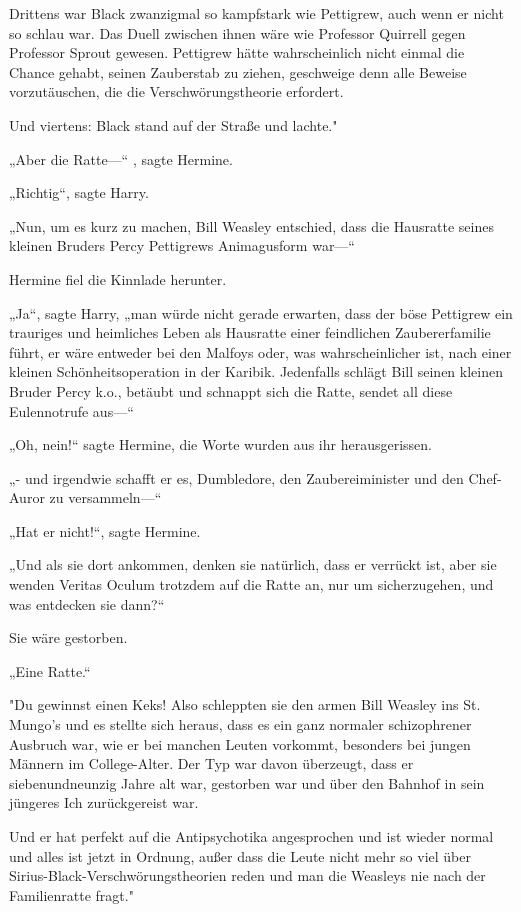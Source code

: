 {Drittens war Black zwanzigmal so kampfstark wie Pettigrew, auch wenn er nicht so schlau war. Das Duell zwischen ihnen wäre wie Professor Quirrell gegen Professor Sprout gewesen. Pettigrew hätte wahrscheinlich nicht einmal die Chance gehabt, seinen Zauberstab zu ziehen, geschweige denn alle Beweise vorzutäuschen, die die Verschwörungstheorie erfordert.

Und viertens: Black stand auf der Straße und lachte."

„Aber die Ratte—“ , sagte Hermine.

„Richtig“, sagte Harry.

„Nun, um es kurz zu machen, Bill Weasley entschied, dass die Hausratte seines kleinen Bruders Percy Pettigrews Animagusform war—“

Hermine fiel die Kinnlade herunter.

„Ja“, sagte Harry, „man würde nicht gerade erwarten, dass der böse Pettigrew ein trauriges und heimliches Leben als Hausratte einer feindlichen Zaubererfamilie führt, er wäre entweder bei den Malfoys oder, was wahrscheinlicher ist, nach einer kleinen Schönheitsoperation in der Karibik. Jedenfalls schlägt Bill seinen kleinen Bruder Percy k.o., betäubt und schnappt sich die Ratte, sendet all diese Eulennotrufe aus—“

„Oh, nein!“ sagte Hermine, die Worte wurden aus ihr herausgerissen.

„- und irgendwie schafft er es, Dumbledore, den Zaubereiminister und den Chef-Auror zu versammeln—“

„Hat er nicht!“, sagte Hermine.

„Und als sie dort ankommen, denken sie natürlich, dass er verrückt ist, aber sie wenden Veritas Oculum trotzdem auf die Ratte an, nur um sicherzugehen, und was entdecken sie dann?“

Sie wäre gestorben.

„Eine Ratte.“

"Du gewinnst einen Keks! Also schleppten sie den armen Bill Weasley ins St. Mungo's und es stellte sich heraus, dass es ein ganz normaler schizophrener Ausbruch war, wie er bei manchen Leuten vorkommt, besonders bei jungen Männern im College-Alter. Der Typ war davon überzeugt, dass er siebenundneunzig Jahre alt war, gestorben war und über den Bahnhof in sein jüngeres Ich zurückgereist war.

Und er hat perfekt auf die Antipsychotika angesprochen und ist wieder normal und alles ist jetzt in Ordnung, außer dass die Leute nicht mehr so viel über Sirius-Black-Verschwörungstheorien reden und man die Weasleys nie nach der Familienratte fragt."

}
